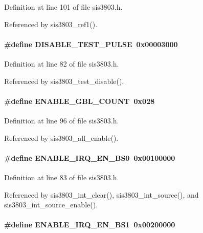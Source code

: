 Definition at line 101 of file sis3803.h.

Referenced by sis3803\_\-ref1().
\paragraph[{DISABLE\_\-TEST\_\-PULSE}]{\setlength{\rightskip}{0pt plus 5cm}\#define DISABLE\_\-TEST\_\-PULSE~0x00003000}\hfill\label{sis3803_8h_a1c2a6bf780e5a02c2a449cac37706f5e}


Definition at line 82 of file sis3803.h.

Referenced by sis3803\_\-test\_\-disable().
\paragraph[{ENABLE\_\-GBL\_\-COUNT}]{\setlength{\rightskip}{0pt plus 5cm}\#define ENABLE\_\-GBL\_\-COUNT~0x028}\hfill\label{sis3803_8h_ada07007126c2fdb726568aecd8f27685}


Definition at line 96 of file sis3803.h.

Referenced by sis3803\_\-all\_\-enable().
\paragraph[{ENABLE\_\-IRQ\_\-EN\_\-BS0}]{\setlength{\rightskip}{0pt plus 5cm}\#define ENABLE\_\-IRQ\_\-EN\_\-BS0~0x00100000}\hfill\label{sis3803_8h_a1ae4d45a793e71d6163dbbc90204c671}


Definition at line 83 of file sis3803.h.

Referenced by sis3803\_\-int\_\-clear(), sis3803\_\-int\_\-source(), and sis3803\_\-int\_\-source\_\-enable().
\paragraph[{ENABLE\_\-IRQ\_\-EN\_\-BS1}]{\setlength{\rightskip}{0pt plus 5cm}\#define ENABLE\_\-IRQ\_\-EN\_\-BS1~0x00200000}\hfill\label{sis3803_8h_af15cffabc07cb1744d0c628712b46375}


